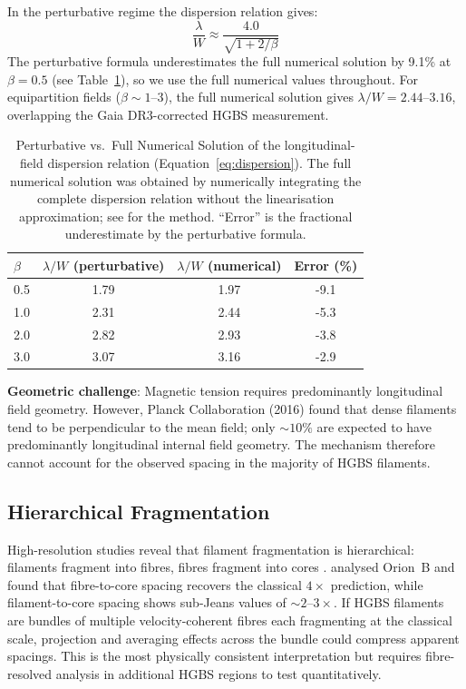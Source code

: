 \documentclass[twoside,twocolumn]{mnras}
\begin{document}
In the perturbative regime the dispersion relation gives:
\begin{equation}
\frac{\lambda}{W} \approx \frac{4.0}{\sqrt{1 + 2/\beta}}
\label{eq:tension}
\end{equation}
The perturbative formula underestimates the full numerical solution by 9.1\% at $\beta=0.5$
(see Table~\ref{tab:perturbative}), so we use the full numerical values throughout.
For equipartition fields ($\beta \sim 1$--$3$), the full numerical solution gives
$\lambda/W = 2.44$--$3.16$, overlapping the Gaia DR3-corrected HGBS measurement.

\begin{table}
\caption{Perturbative vs.\ Full Numerical Solution of the \citet{Nakamura1993} longitudinal-field dispersion relation (Equation~\ref{eq:dispersion}). The full numerical solution was obtained by numerically integrating the complete dispersion relation without the linearisation approximation; see \citet{Nakamura1993} for the method. ``Error'' is the fractional underestimate by the perturbative formula.}
\label{tab:perturbative}
\begin{tabular}{lccc}
\toprule
$\beta$ & $\lambda/W$ (perturbative) & $\lambda/W$ (numerical) & Error (\%) \\
\midrule
0.5 & 1.79 & 1.97 & -9.1 \\
1.0 & 2.31 & 2.44 & -5.3 \\
2.0 & 2.82 & 2.93 & -3.8 \\
3.0 & 3.07 & 3.16 & -2.9 \\
\bottomrule
\end{tabular}
\end{table}

\textbf{Geometric challenge}: Magnetic tension requires predominantly longitudinal field
geometry. However, Planck Collaboration (2016) found that dense filaments tend to be
perpendicular to the mean field; only ${\sim}10\%$ are expected to have predominantly
longitudinal internal field geometry. The mechanism therefore cannot account for the
observed spacing in the majority of HGBS filaments.

\subsection{Hierarchical Fragmentation}

High-resolution studies reveal that filament fragmentation is hierarchical: filaments
fragment into fibres, fibres fragment into cores \citep{Hacar2013, Hacar2018}.
\citet{Yang2024} analysed Orion~B and found that fibre-to-core spacing recovers the
classical $4\times$ prediction, while filament-to-core spacing shows sub-Jeans values
of ${\sim}2$--$3\times$. If HGBS filaments are bundles of multiple velocity-coherent
fibres each fragmenting at the classical scale, projection and averaging effects across
the bundle could compress apparent spacings. This is the most physically consistent interpretation
but requires fibre-resolved analysis in additional HGBS regions to test quantitatively.
\end{document}
